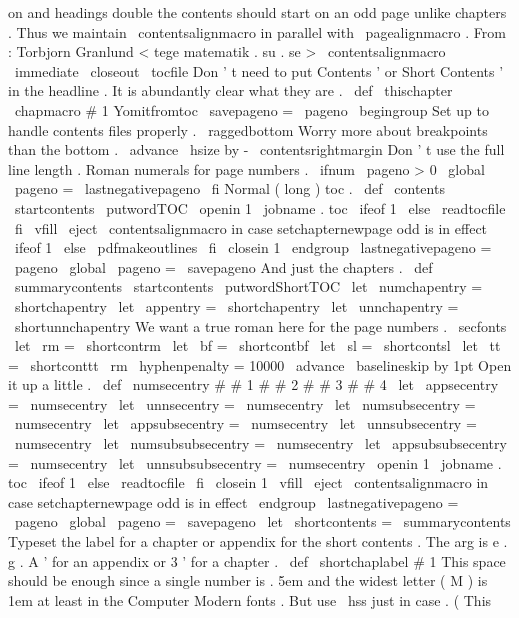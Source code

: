 {{{on
and
headings
double
the
contents
should
%
start
on
an
odd
page
unlike
chapters
.
Thus
we
maintain
%
\
contentsalignmacro
in
parallel
with
\
pagealignmacro
.
%
From
:
Torbjorn
Granlund
<
tege
matematik
.
su
.
se
>
\
contentsalignmacro
\
immediate
\
closeout
\
tocfile
%
%
Don
'
t
need
to
put
Contents
'
or
Short
Contents
'
in
the
headline
.
%
It
is
abundantly
clear
what
they
are
.
\
def
\
thischapter
{
}
%
\
chapmacro
{
#
1
}
{
Yomitfromtoc
}
{
}
%
%
\
savepageno
=
\
pageno
\
begingroup
%
Set
up
to
handle
contents
files
properly
.
\
raggedbottom
%
Worry
more
about
breakpoints
than
the
bottom
.
\
advance
\
hsize
by
-
\
contentsrightmargin
%
Don
'
t
use
the
full
line
length
.
%
%
Roman
numerals
for
page
numbers
.
\
ifnum
\
pageno
>
0
\
global
\
pageno
=
\
lastnegativepageno
\
fi
}
%
Normal
(
long
)
toc
.
\
def
\
contents
{
%
\
startcontents
{
\
putwordTOC
}
%
\
openin
1
\
jobname
.
toc
\
ifeof
1
\
else
\
readtocfile
\
fi
\
vfill
\
eject
\
contentsalignmacro
%
in
case
setchapternewpage
odd
is
in
effect
\
ifeof
1
\
else
\
pdfmakeoutlines
\
fi
\
closein
1
\
endgroup
\
lastnegativepageno
=
\
pageno
\
global
\
pageno
=
\
savepageno
}
%
And
just
the
chapters
.
\
def
\
summarycontents
{
%
\
startcontents
{
\
putwordShortTOC
}
%
%
\
let
\
numchapentry
=
\
shortchapentry
\
let
\
appentry
=
\
shortchapentry
\
let
\
unnchapentry
=
\
shortunnchapentry
%
We
want
a
true
roman
here
for
the
page
numbers
.
\
secfonts
\
let
\
rm
=
\
shortcontrm
\
let
\
bf
=
\
shortcontbf
\
let
\
sl
=
\
shortcontsl
\
let
\
tt
=
\
shortconttt
\
rm
\
hyphenpenalty
=
10000
\
advance
\
baselineskip
by
1pt
%
Open
it
up
a
little
.
\
def
\
numsecentry
#
#
1
#
#
2
#
#
3
#
#
4
{
}
\
let
\
appsecentry
=
\
numsecentry
\
let
\
unnsecentry
=
\
numsecentry
\
let
\
numsubsecentry
=
\
numsecentry
\
let
\
appsubsecentry
=
\
numsecentry
\
let
\
unnsubsecentry
=
\
numsecentry
\
let
\
numsubsubsecentry
=
\
numsecentry
\
let
\
appsubsubsecentry
=
\
numsecentry
\
let
\
unnsubsubsecentry
=
\
numsecentry
\
openin
1
\
jobname
.
toc
\
ifeof
1
\
else
\
readtocfile
\
fi
\
closein
1
\
vfill
\
eject
\
contentsalignmacro
%
in
case
setchapternewpage
odd
is
in
effect
\
endgroup
\
lastnegativepageno
=
\
pageno
\
global
\
pageno
=
\
savepageno
}
\
let
\
shortcontents
=
\
summarycontents
%
Typeset
the
label
for
a
chapter
or
appendix
for
the
short
contents
.
%
The
arg
is
e
.
g
.
A
'
for
an
appendix
or
3
'
for
a
chapter
.
%
\
def
\
shortchaplabel
#
1
{
%
%
This
space
should
be
enough
since
a
single
number
is
.
5em
and
the
%
widest
letter
(
M
)
is
1em
at
least
in
the
Computer
Modern
fonts
.
%
But
use
\
hss
just
in
case
.
%
(
This
}}}
